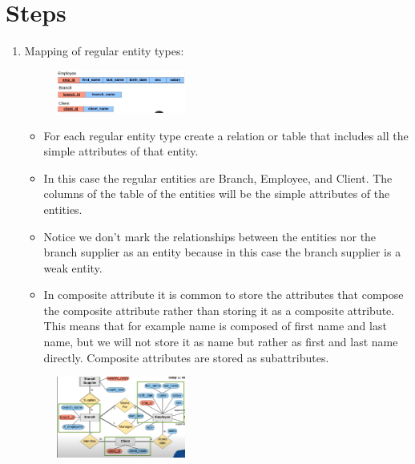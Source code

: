 \section{Steps}
\begin{enumerate}
    \item Mapping of regular entity types:
        \begin{figure}[H]
            \centering
            \includegraphics[width=0.4\textwidth]{./Figs/2020-12-24-22-59-55.png}
        \end{figure}
        \begin{itemize}
            \item For each regular entity type create a relation or table that includes all the simple attributes of that entity.
            \item In this case the regular entities are Branch, Employee, and Client. The columns of the table of the entities will be the simple attributes of the entities.
            \item Notice we don't mark the relationships between the entities nor the branch supplier as an entity because in this case the branch supplier is a weak entity.
            \item In composite attribute it is common to store the attributes that compose the composite attribute rather than storing it as a composite attribute. This means that for example name is composed of first name and last name, but we will not store it as name but rather as first and last name directly. Composite attributes are stored as subattributes.
        \end{itemize}
        \begin{figure}[H]
            \centering
            \includegraphics[width=0.4\textwidth]{./Figs/2020-12-24-22-58-24.png}
        \end{figure}
        

\end{enumerate}
